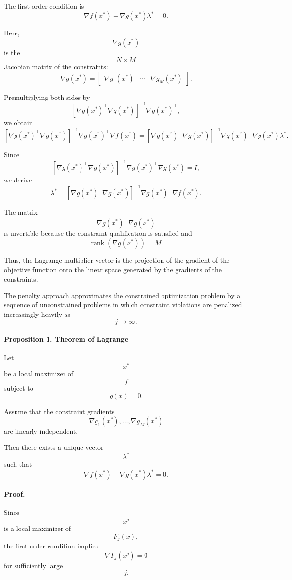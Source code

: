 The first-order condition is
\[
\nabla f(x^*)
-
\nabla g(x^*)\lambda^*
=
0.
\]

Here,
\[
\nabla g(x^*)
\]
is the
\[
N\times M
\]
Jacobian matrix of the constraints:
\[
\nabla g(x^*)
=
\begin{bmatrix}
\nabla g_1(x^*) &
\cdots &
\nabla g_M(x^*)
\end{bmatrix}.
\]

Premultiplying both sides by
\[
[\nabla g(x^*)^\top\nabla g(x^*)]^{-1}
\nabla g(x^*)^\top,
\]
we obtain
\[
[\nabla g(x^*)^\top\nabla g(x^*)]^{-1}
\nabla g(x^*)^\top
\nabla f(x^*)
=
[\nabla g(x^*)^\top\nabla g(x^*)]^{-1}
\nabla g(x^*)^\top
\nabla g(x^*)
\lambda^*.
\]

Since
\[
[\nabla g(x^*)^\top\nabla g(x^*)]^{-1}
\nabla g(x^*)^\top
\nabla g(x^*)
=
I,
\]
we derive
\[
\lambda^*
=
[\nabla g(x^*)^\top\nabla g(x^*)]^{-1}
\nabla g(x^*)^\top
\nabla f(x^*).
\]

The matrix
\[
\nabla g(x^*)^\top\nabla g(x^*)
\]
is invertible because the constraint qualification is satisfied and
\[
\operatorname{rank}(\nabla g(x^*))=M.
\]

Thus, the Lagrange multiplier vector is the projection of the gradient of the objective function onto the linear space generated by the gradients of the constraints.

The penalty approach approximates the constrained optimization problem by a sequence of unconstrained problems in which constraint violations are penalized increasingly heavily as
\[
j\to\infty.
\]

\paragraph{Proposition 1. Theorem of Lagrange}

Let
\[
x^*
\]
be a local maximizer of
\[
f
\]
subject to
\[
g(x)=0.
\]

Assume that the constraint gradients
\[
\nabla g_1(x^*),
\dots,
\nabla g_M(x^*)
\]
are linearly independent.

Then there exists a unique vector
\[
\lambda^*
\]
such that
\[
\nabla f(x^*)
-
\nabla g(x^*)\lambda^*
=
0.
\]

\paragraph{Proof.}

Since
\[
x^j
\]
is a local maximizer of
\[
F_j(x),
\]
the first-order condition implies
\[
\nabla F_j(x^j)=0
\]
for sufficiently large
\[
j.
\]

